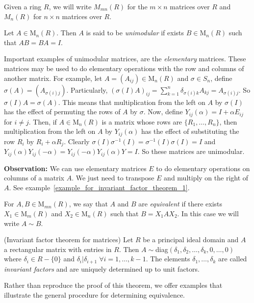 \begin{dang}
    \begin{notation}
       Given a ring $R$, we will write $M_{mn}(R)$ for the $m\times n$ matrices over $R$ and $M_n(R)$ for $n\times n$ matrices over $R$.
    \end{notation}
\end{dang}
\begin{dang}
    \begin{definition}
        Let $A\in\text{M}_{n}(R)$. Then $A$ is said to be \textit{unimodular} if exists $B\in\text{M}_n(R)$ such that $AB=BA=I$.
    \end{definition}
\end{dang}
Important examples of unimodular matrices, are the \textit{elementary} matrices. These matrices may be used to do elementary operations with the row and columns of another matrix. For example, let $A=(A_{ij})\in \text{M}_n(R)$ and $\sigma\in S_n$, define $\sigma(A)=(A_{\sigma(i)j})$. Particularly, $(\sigma(I)A)_{ij}=\sum_{k=1}^n\delta_{\sigma(i)k}A_{kj}=A_{\sigma(i)j}$. So $\sigma(I)A=\sigma(A)$. This means that multiplication from the left on $A$ by $\sigma(I)$ has the effect of permuting the rows of $A$ by $\sigma$. Now, define $Y_{ij}(\alpha)=I+\alpha E_{ij}$ for $i\neq j$. Then, if $A\in\text{M}_n(R)$ is a matrix whose rows are $\{R_1,\dots,R_n\}$, then multiplication from the left on $A$ by $Y_{ij}(\alpha)$ has the effect of substituting the row $R_i$ by $R_i+\alpha R_j$. Clearly $\sigma(I)\sigma^{-1}(I)=\sigma^{-1}(I)\sigma(I)=I$ and $Y_{ij}(\alpha)Y_{ij}(-\alpha)=Y_{ij}(-\alpha)Y_{ij}(\alpha)Y=I$. So these matrices are unimodular.
\begin{dang}
    \textbf{Observation:} We can use elementary matrices $E$ to do elementary operations on columns of a matrix $A$. We just need to transpose $E$ and multiply on the right of $A$. See example~\ref{example_for_invariant_factor_theorem_1}.
\end{dang}
\begin{dang}
    \begin{definition}\cite{curtis1966representation}
        For $A,B\in\text{M}_{mn}(R)$, we say that $A$ and $B$ are \textit{equivalent} if there exists $X_1\in\text{M}_m(R)$ and $X_2\in\text{M}_n(R)$ such that $B=X_1AX_2$. In this case we will write $A\sim B$.
    \end{definition}
\end{dang}
\begin{dang}
    \begin{theorem}(Invariant factor theorem for matrices)\label{invariant_factors_theorem}\cite{curtis1966representation}
        Let $R$ be a principal ideal domain and $A$ a rectangular matrix with entries in $R$. Then $A\sim$diag$(\delta_1,\delta_2,\dots,\delta_k,0,\dots,0)$ where $\delta_i\in R-\{0\}$ and $\delta_i|\delta_{i+1}\;\forall i=1,\dots,k-1$. The elements $\delta_1,\dots,\delta_k$ are called \textit{invariant factors} and are uniquely determined up to unit factors.
    \end{theorem}
\end{dang}
Rather than reproduce the proof of this theorem, we offer examples that illustrate the general procedure for determining equivalence. 


